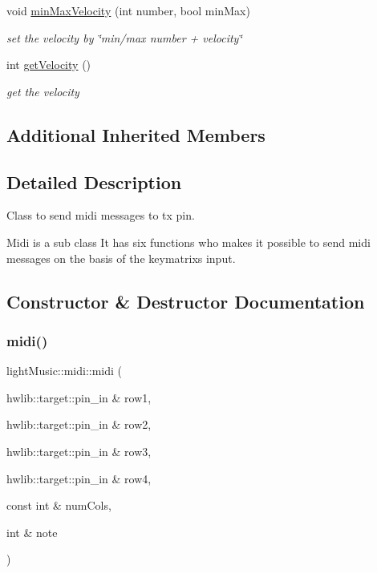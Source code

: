 \begin{DoxyCompactItemize}
void \hyperlink{classlight_music_1_1midi_a8ca9db5a0738b181107d2035a3439798}{min\+Max\+Velocity} (int number, bool min\+Max)
\begin{DoxyCompactList}\small\item\em set the velocity by \char`\"{}min/max number + velocity\char`\"{} \end{DoxyCompactList}\item 
int \hyperlink{classlight_music_1_1midi_aed22201e6c80c8fb8242803e22d71032}{get\+Velocity} ()
\begin{DoxyCompactList}\small\item\em get the velocity \end{DoxyCompactList}\end{DoxyCompactItemize}
\subsection*{Additional Inherited Members}


\subsection{Detailed Description}
Class to send midi messages to tx pin. 

Midi is a sub class It has six functions who makes it possible to send midi messages on the basis of the keymatrix\textquotesingle{}s input. 

\subsection{Constructor \& Destructor Documentation}
\mbox{\label{classlight_music_1_1midi_a07cce4974be1f6bc22238c15cdba5867}} 
\subsubsection{\texorpdfstring{midi()}{midi()}}
{\footnotesize\ttfamily light\+Music\+::midi\+::midi (\begin{DoxyParamCaption}\item[{hwlib\+::target\+::pin\+\_\+in \&}]{row1,  }\item[{hwlib\+::target\+::pin\+\_\+in \&}]{row2,  }\item[{hwlib\+::target\+::pin\+\_\+in \&}]{row3,  }\item[{hwlib\+::target\+::pin\+\_\+in \&}]{row4,  }\item[{const int \&}]{num\+Cols,  }\item[{int \&}]{note }\end{DoxyParamCaption})}



